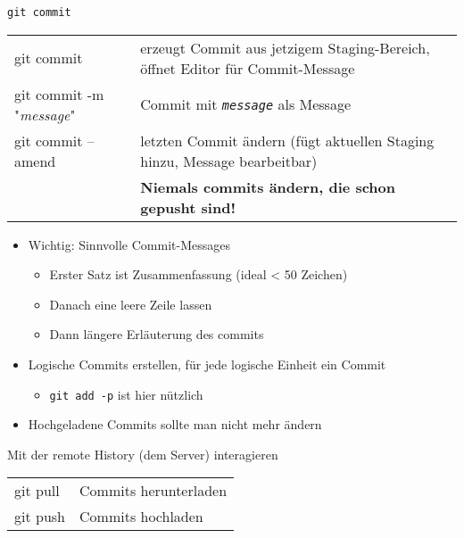 \begin{frame}{\texttt{git commit}}
  \begin{tabu}{>{\ttfamily}l X[,L]}
    git commit                       & erzeugt Commit aus jetzigem Staging-Bereich, öffnet Editor für Commit-Message \\
    git commit -m "\textit{message}" & Commit mit \texttt{\textit{message}} als Message \\
    git commit --amend               & letzten Commit ändern (fügt aktuellen Staging hinzu, Message bearbeitbar) \\
    & \alert{\bfseries Niemals commits ändern, die schon gepusht sind!}
  \end{tabu}

  \begin{itemize}
    \item Wichtig: Sinnvolle Commit-Messages
      \begin{itemize}
        \item Erster Satz ist Zusammenfassung (ideal < 50 Zeichen)
        \item Danach eine leere Zeile lassen
        \item Dann längere Erläuterung des commits
      \end{itemize}
    \item Logische Commits erstellen, für jede logische Einheit ein Commit
      \begin{itemize}
        \item \texttt{git add -p} ist hier nützlich
      \end{itemize}
    \item Hochgeladene Commits sollte man nicht mehr ändern
  \end{itemize}
\end{frame}



\begin{frame}{Mit der remote History (dem Server) interagieren}
  \begin{tabu}{>{\ttfamily}l X[,L]}
    git pull          & Commits herunterladen \\
    git push          & Commits hochladen
  \end{tabu}
\end{frame}

